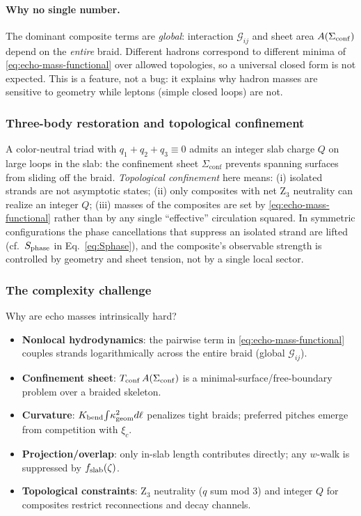 \paragraph{Why no single number.} The dominant composite terms are \emph{global}: interaction $\mathcal{G}_{ij}$ and sheet area $A(\Sigma_{\rm conf})$ depend on the \emph{entire} braid. Different hadrons correspond to different minima of \eqref{eq:echo-mass-functional} over allowed topologies, so a universal closed form is not expected. This is a feature, not a bug: it explains why hadron masses are sensitive to geometry while leptons (simple closed loops) are not.

\subsubsection{Three-body restoration and topological confinement}
\label{sec:echo:baryons}

A color-neutral triad with $q_1+q_2+q_3\equiv 0$ admits an integer slab charge $Q$ on large loops in the slab: the confinement sheet $\Sigma_{\mathrm{conf}}$ prevents spanning surfaces from sliding off the braid. \emph{Topological confinement} here means: (i) isolated strands are not asymptotic states; (ii) only composites with net Z$_3$ neutrality can realize an integer $Q$; (iii) masses of the composites are set by \eqref{eq:echo-mass-functional} rather than by any single ``effective'' circulation squared. In symmetric configurations the phase cancellations that suppress an isolated strand are lifted (cf.\ $S_{\rm phase}$ in Eq.~\eqref{eq:Sphase}), and the composite’s observable strength is controlled by geometry and sheet tension, not by a single local sector.

\subsubsection{The complexity challenge}
\label{sec:echo:complexity}

Why are echo masses intrinsically hard?

\begin{itemize}
\item \textbf{Nonlocal hydrodynamics}: the pairwise term in \eqref{eq:echo-mass-functional} couples strands logarithmically across the entire braid (global $\mathcal{G}_{ij}$).
\item \textbf{Confinement sheet}: $T_{\rm conf}\,A(\Sigma_{\rm conf})$ is a minimal-surface/free-boundary problem over a braided skeleton.
\item \textbf{Curvature}: $K_{\rm bend}\!\int\!\kappa_{\rm geom}^2 d\ell$ penalizes tight braids; preferred pitches emerge from competition with $\xi_c$.
\item \textbf{Projection/overlap}: only in-slab length contributes directly; any $w$-walk is suppressed by $f_{\rm slab}(\zeta)$.
\item \textbf{Topological constraints}: Z$_3$ neutrality ($q$ sum mod 3) and integer $Q$ for composites restrict reconnections and decay channels.
\end{itemize}


